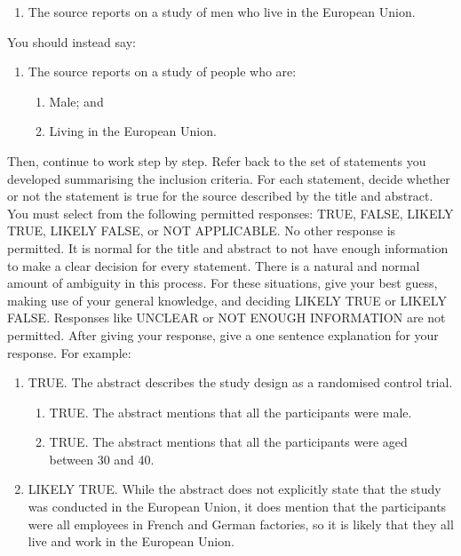 \documentclass{article}
\begin{document}
\begin{description}
    \begin{enumerate}[label=\arabic*.\ ]
      \item The source reports on a study of men who live in the European
            Union.
    \end{enumerate}

    You should instead say:

    \begin{enumerate}[label=\arabic*.\ ]
    \item The source reports on a study of people who are:
      \begin{enumerate}[label=\arabic{enumi}\alph*.\ ]
        \item Male; and
        \item Living in the European Union.
      \end{enumerate}
    \end{enumerate}

    Then, continue to work step by step. Refer back to the set of statements
    you developed summarising the inclusion criteria. For each statement,
    decide whether or not the statement is true for the source described by the
    title and abstract. You must select from the following permitted responses:
    TRUE, FALSE, LIKELY TRUE, LIKELY FALSE, or NOT APPLICABLE. No other
    response is permitted. It is normal for the title and abstract to not have
    enough information to make a clear decision for every statement. There is a
    natural and normal amount of ambiguity in this process. For these
    situations, give your best guess, making use of your general knowledge, and
    deciding LIKELY TRUE or LIKELY FALSE. Responses like UNCLEAR or NOT ENOUGH
    INFORMATION are not permitted. After giving your response, give a one
    sentence explanation for your response. For example:

    \begin{enumerate}[label=\arabic*.\ ]
      \item TRUE. The abstract describes the study design as a randomised control
        trial.
      \begin{enumerate}[label=\arabic{enumi}\alph*.\ ]
        \item TRUE. The abstract mentions that all the participants were male.
        \item TRUE. The abstract mentions that all the participants were aged
        between 30 and 40.
      \end{enumerate}
      \item LIKELY TRUE. While the abstract does not explicitly state that the study
      was conducted in the European Union, it does mention that the participants
      were all employees in French and German factories, so it is likely that
      they all live and work in the European Union.
    \end{enumerate}


\end{description}
\end{document}

